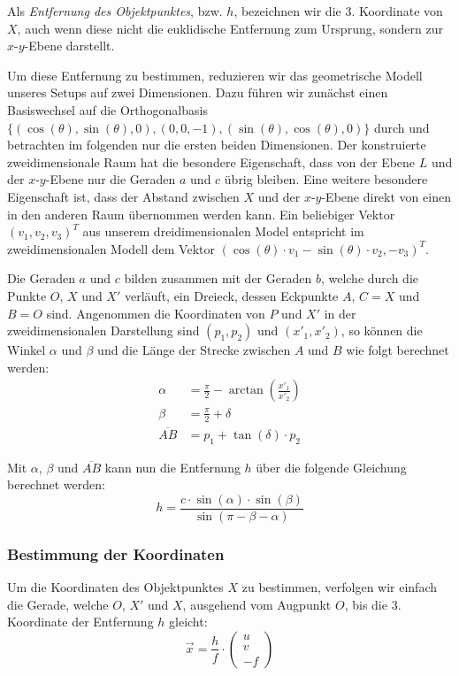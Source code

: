 \documentclass[ngerman,a4paper]{scrartcl}
\begin{document}
Als \emph{Entfernung des Objektpunktes}, bzw. $h$, bezeichnen wir die 3. Koordinate von $X$, auch wenn diese nicht die euklidische Entfernung zum Ursprung, sondern zur $x$-$y$-Ebene darstellt.

Um diese Entfernung zu bestimmen, reduzieren wir das geometrische Modell unseres Setups auf zwei Dimensionen. Dazu führen wir zunächst einen Basiswechsel auf die Orthogonalbasis $\{(\cos(\theta), \sin(\theta), 0), (0, 0, -1), (\sin(\theta), \cos(\theta), 0)\}$ durch und betrachten im folgenden nur die ersten beiden Dimensionen. Der konstruierte zweidimensionale Raum hat die besondere Eigenschaft, dass von der Ebene $L$ und der $x$-$y$-Ebene nur die Geraden $a$ und $c$ übrig bleiben. Eine weitere besondere Eigenschaft ist, dass der Abstand zwischen $X$ und der $x$-$y$-Ebene direkt von einen in den anderen Raum übernommen werden kann. Ein beliebiger Vektor $(v_1, v_2, v_3)^T$ aus unserem dreidimensionalen Model entspricht im zweidimensionalen Modell dem Vektor $(\cos(\theta) \cdot v_1 - \sin(\theta) \cdot v_2, -v_3)^T$.

Die Geraden $a$ und $c$ bilden zusammen mit der Geraden $b$, welche durch die Punkte $O$, $X$ und $X'$ verläuft, ein Dreieck, dessen Eckpunkte $A$, $C = X$ und $B = O$ sind. Angenommen die Koordinaten von $P$ und $X'$ in der zweidimensionalen Darstellung sind $(p_1,p_2)$ und $(x'_1, x'_2)$, so können die Winkel $\alpha$ und $\beta$ und die Länge der Strecke zwischen $A$ und $B$ wie folgt berechnet werden:
\begin{align*}
	\alpha &= \frac{\pi}{2} - \arctan\left(\frac{x'_1}{x'_2}\right)\\
	\beta &= \frac{\pi}{2} + \delta\\
	\overline{AB} &= p_1 + \tan(\delta) \cdot p_2
\end{align*}

Mit $\alpha$, $\beta$ und $\overline{AB}$ kann nun die Entfernung $h$ über die folgende Gleichung berechnet werden:
\[ h = \frac{c \cdot \sin(\alpha) \cdot \sin(\beta)}{\sin(\pi - \beta - \alpha)} \]

\subsubsection{Bestimmung der Koordinaten}

Um die Koordinaten des Objektpunktes $X$ zu bestimmen, verfolgen wir einfach die Gerade, welche $O$, $X'$ und $X$, ausgehend vom Augpunkt $O$, bis die 3. Koordinate der Entfernung $h$ gleicht:
\[ \vec{x} = \frac{h}{f} \cdot \begin{pmatrix}
u \\ v \\ -f
\end{pmatrix} \]
\end{document}
